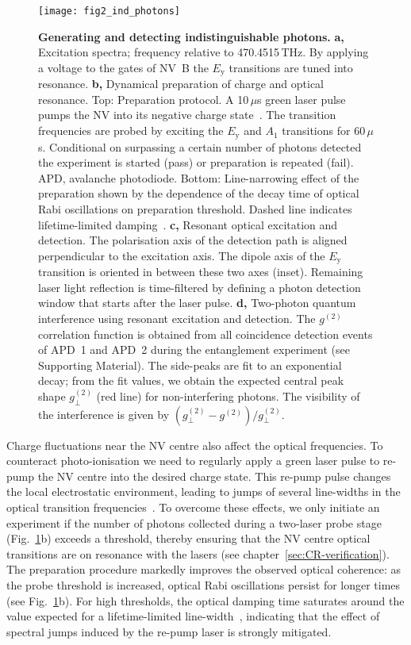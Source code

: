 \begin{figure}[tp]
	\centering
	\texttt{[image: fig2\_ind\_photons]}
	\caption{\label{fig:LDE-fig2} \textbf{Generating and detecting indistinguishable photons.}
	\textbf{a,} Excitation spectra; frequency relative to 470.4515$\,$THz. By applying a voltage to the gates of NV~B the $E_\text{y}$ transitions are tuned into resonance. 
	\textbf{b,} Dynamical preparation of charge and optical resonance. Top: Preparation protocol. A 10$\,\mu$s green laser pulse pumps the NV into its negative charge state~\cite{Robledo_Nature_2011}. The transition frequencies are probed by exciting the $E_\text{y}$ and $A_\text{1}$ transitions for 60$\,\mu$s. Conditional on surpassing a certain number of photons detected the experiment is started (pass) or preparation is repeated (fail). APD, avalanche photodiode. Bottom: Line-narrowing effect of the preparation shown by the dependence of the decay time of optical Rabi oscillations on preparation threshold. Dashed line indicates lifetime-limited damping~\cite{Robledo_Phys.Rev.Lett._2010}. 
	\textbf{c,} Resonant optical excitation and detection. The polarisation axis of the detection path is aligned perpendicular to the excitation axis. The dipole axis of the $E_\text{y}$ transition is oriented in between these two axes (inset). Remaining laser light reflection is time-filtered by defining a photon detection window that starts after the laser pulse. 
	\textbf{d,} Two-photon quantum interference using resonant excitation and detection. The $g^{(2)}$ correlation function is obtained from all coincidence detection events of APD~1 and APD~2 during the entanglement experiment (see Supporting Material). The side-peaks are fit to an exponential decay; from the fit values, we obtain the expected central peak shape $g_\perp^{(2)}$ (red line) for non-interfering photons. The visibility of the interference is given by $(g_\perp^{(2)}-g^{(2)})/g_\perp^{(2)}$.}
\end{figure}


Charge fluctuations near the NV centre also affect the optical frequencies. To counteract photo-ionisation we need to regularly apply a green laser pulse to re-pump the NV centre into the desired charge state. This re-pump pulse changes the local electrostatic environment, leading to jumps of several line-widths in the optical transition frequencies~\cite{Robledo_Phys.Rev.Lett._2010}. To overcome these effects, we only initiate an experiment if the number of photons collected during a two-laser probe stage (Fig.~\ref{fig:LDE-fig2}b) exceeds a threshold, thereby ensuring that the NV centre optical transitions are on resonance with the lasers (see chapter~\ref{sec:CR-verification}). The preparation procedure markedly improves the observed optical coherence: as the probe threshold is increased, optical Rabi oscillations persist for longer times (see Fig.~\ref{fig:LDE-fig2}b). For high thresholds, the optical damping time saturates around the value expected for a lifetime-limited line-width~\cite{Robledo_Phys.Rev.Lett._2010}, indicating that the effect of spectral jumps induced by the re-pump laser is strongly mitigated.

